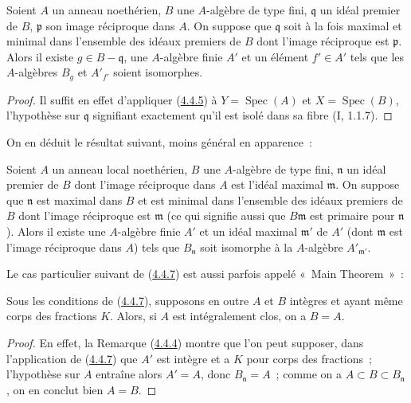 
\begin{corollary}[4.4.6]
\label{III.4.4.6-fr}
Soient $A$ un anneau noethérien, $B$ une $A$-algèbre de type fini,
$\mathfrak q$ un idéal premier de $B$, $\mathfrak p$ son image réciproque
dans $A$. On suppose que $\mathfrak q$ soit à la fois maximal et minimal dans
l'ensemble des idéaux premiers de $B$ dont l'image réciproque est
$\mathfrak p$. Alors il existe $g\in B-\mathfrak q$, une $A$-algèbre finie
$A'$ et un élément $f'\in A'$ tels que les $A$-algèbres $B_g$ et $A'_{f'}$
soient isomorphes.
\end{corollary}

\begin{proof}
Il suffit en effet d'appliquer (\hyperref[III.4.4.5-fr]{4.4.5}) à
$Y=\operatorname{Spec}(A)$ et $X=\operatorname{Spec}(B)$, l'hypothèse sur
$\mathfrak q$ signifiant exactement qu'il est isolé dans sa fibre
(I, 1.1.7).
\end{proof}

On en déduit le résultat suivant, moins général en apparence~:

\begin{corollary}[4.4.7]
\label{III.4.4.7-fr}
Soient $A$ un anneau local noethérien, $B$ une $A$-algèbre de type fini,
$\mathfrak n$ un idéal premier de $B$ dont l'image réciproque dans $A$ est
l'idéal maximal $\mathfrak m$. On suppose que $\mathfrak n$ est maximal dans
$B$ et est minimal dans l'ensemble des idéaux premiers de $B$ dont l'image
réciproque est $\mathfrak m$ (ce qui signifie aussi que
$B\mathfrak m$ est primaire pour $\mathfrak n$). Alors il existe une
$A$-algèbre finie $A'$ et un idéal maximal $\mathfrak m'$ de $A'$ (dont
$\mathfrak m$ est l'image réciproque dans $A$) tels que $B_{\mathfrak n}$
soit isomorphe à la $A$-algèbre $A'_{\mathfrak m'}$.
\end{corollary}

Le cas particulier suivant de (\hyperref[III.4.4.7-fr]{4.4.7}) est aussi
parfois appelé «~Main Theorem~»~:

\begin{corollary}[4.4.8]
\label{III.4.4.8-fr}
Sous les conditions de (\hyperref[III.4.4.7-fr]{4.4.7}), supposons en outre
$A$ et $B$ intègres et ayant même corps des fractions $K$. Alors, si $A$ est
intégralement clos, on a $B=A$.
\end{corollary}

\begin{proof}
En effet, la Remarque (\hyperref[III.4.4.4-fr]{4.4.4}) montre que l'on peut
supposer, dans l'application de (\hyperref[III.4.4.7-fr]{4.4.7}) que $A'$ est
intègre et a $K$ pour corps des fractions~; l'hypothèse sur $A$ entraîne alors
$A'=A$, donc $B_{\mathfrak n}=A$~; comme on a
$A\subset B\subset B_{\mathfrak n}$, on en conclut bien $A=B$.
\end{proof}

